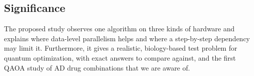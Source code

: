 \subsection{Significance}

The proposed study observes one algorithm on three kinds of hardware and explains where data-level parallelism helps and where a step-by-step dependency may limit it. Furthermore, it gives a realistic, biology-based test problem for quantum optimization, with exact answers to compare against, and the first QAOA study of AD drug combinations that we are aware of.
